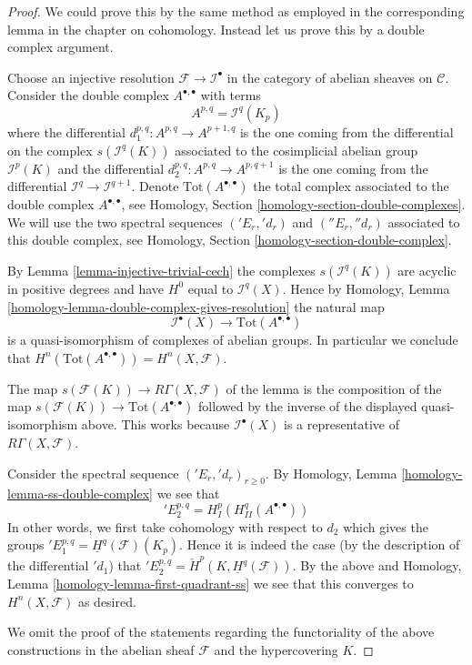 \documentclass[10pt,a4paper]{amsart}
\theoremstyle{plain}
\theoremstyle{definition}
\theoremstyle{remark}
\numberwithin{equation}{subsection}
\begin{document}
\begin{proof}
We could prove this by the same method as employed in the corresponding
lemma in the chapter on cohomology. Instead let us prove this by a
double complex argument.

\medskip\noindent
Choose an injective resolution $\mathcal{F} \to \mathcal{I}^\bullet$
in the category of abelian sheaves on $\mathcal{C}$. Consider the
double complex $A^{\bullet, \bullet}$ with terms
$$
A^{p, q} = \mathcal{I}^q(K_p)
$$
where the differential $d_1^{p, q} : A^{p, q} \to A^{p + 1, q}$ is the one
coming from the differential on the complex $s(\mathcal{I}^q(K))$
associated to the cosimplicial abelian group $\mathcal{I}^p(K)$
and the differential $d_2^{p, q} : A^{p, q} \to A^{p, q + 1}$ is the one
coming from the differential $\mathcal{I}^q \to \mathcal{I}^{q + 1}$.
Denote $\text{Tot}(A^{\bullet, \bullet})$ the total complex associated to
the double complex $A^{\bullet, \bullet}$, see
Homology, Section \ref{homology-section-double-complexes}.
We will use the two spectral
sequences $({}'E_r, {}'d_r)$ and $({}''E_r, {}''d_r)$
associated to this double complex, see
Homology, Section \ref{homology-section-double-complex}.

\medskip\noindent
By Lemma \ref{lemma-injective-trivial-cech}
the complexes $s(\mathcal{I}^q(K))$ are acyclic in
positive degrees and have $H^0$ equal to $\mathcal{I}^q(X)$.
Hence by
Homology, Lemma \ref{homology-lemma-double-complex-gives-resolution}
the natural map
$$
\mathcal{I}^\bullet(X) \longrightarrow \text{Tot}(A^{\bullet, \bullet})
$$
is a quasi-isomorphism of complexes of abelian groups. In particular
we conclude that $H^n(\text{Tot}(A^{\bullet, \bullet})) = H^n(X, \mathcal{F})$.

\medskip\noindent
The map $s(\mathcal{F}(K)) \longrightarrow R\Gamma(X, \mathcal{F})$ of
the lemma is the composition of the map
$s(\mathcal{F}(K)) \to \text{Tot}(A^{\bullet, \bullet})$
followed by the inverse
of the displayed quasi-isomorphism above. This works because
$\mathcal{I}^\bullet(X)$ is a representative of $R\Gamma(X, \mathcal{F})$.

\medskip\noindent
Consider the spectral sequence $({}'E_r, {}'d_r)_{r \geq 0}$. By
Homology, Lemma \ref{homology-lemma-ss-double-complex}
we see that
$$
{}'E_2^{p, q} = H^p_I(H^q_{II}(A^{\bullet, \bullet}))
$$
In other words, we first take cohomology with respect to
$d_2$ which gives the groups
${}'E_1^{p, q} = \underline{H}^q(\mathcal{F})(K_p)$.
Hence it is indeed the case (by the description of the differential
${}'d_1$) that
${}'E_2^{p, q} = \check{H}^p(K, \underline{H}^q(\mathcal{F}))$.
By the above and Homology, Lemma \ref{homology-lemma-first-quadrant-ss}
we see that this converges to $H^n(X, \mathcal{F})$ as desired.

\medskip\noindent
We omit the proof of the statements regarding the functoriality of
the above constructions in the abelian sheaf $\mathcal{F}$ and the
hypercovering $K$.
\end{proof}
\end{document}

